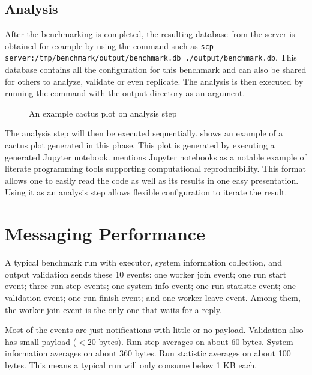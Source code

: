 \subsection{Analysis}

After the benchmarking is completed, the resulting database from the server is obtained for example by using the  command such as \texttt{scp server:/tmp/benchmark/output/benchmark.db ./output/benchmark.db}.
This database contains all the configuration for this benchmark and can also be shared for others to analyze, validate or even replicate.
The analysis is then executed by running the  command with the output directory as an argument.

\begin{figure}
	\centering
	\caption{An example cactus plot on analysis step}
	\label{fig:eval.cactus}
\end{figure}

The analysis step will then be executed sequentially.
 shows an example of a cactus plot generated in this phase.
This plot is generated by executing a generated Jupyter notebook.
\citet{piccoloToolsTechniquesComputational2016} mentions Jupyter notebooks as a notable example of literate programming tools supporting computational reproducibility.
This format allows one to easily read the code as well as its results in one easy presentation.
Using it as an analysis step allows flexible configuration to iterate the result.

\section{Messaging Performance}
\label{sec:eval.messaging}

A typical benchmark run with executor, system information collection, and output validation sends these 10 events:
one worker join event;
one run start event;
three run step events;
one system info event;
one run statistic event;
one validation event;
one run finish event;
and one worker leave event.
Among them, the worker join event is the only one that waits for a reply.

Most of the events are just notifications with little or no payload.
Validation also has small payload ($< 20$ bytes).
Run step averages on about 60 bytes.
System information averages on about 360 bytes.
Run statistic averages on about 100 bytes.
This means a typical run will only consume below 1 KB each.

